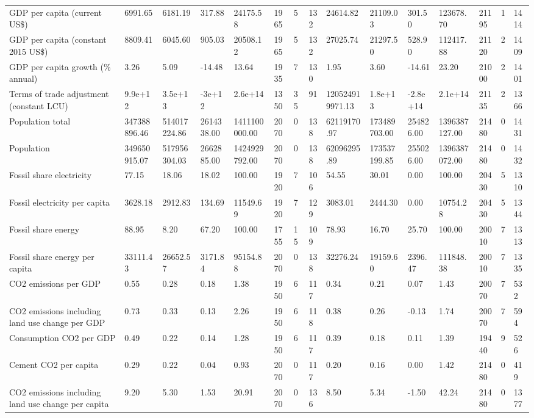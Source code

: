 \begin{longtable}{lllllllllllllll}
GDP per capita (current US\$) & 6991.65 & 6181.19 & 317.88 & 24175.58 & 1965 & 5 & 132 & 24614.82 & 21109.03 & 301.50 & 123678.70 & 21195 & 1 & 1414\\
GDP per capita (constant 2015 US\$) & 8809.41 & 6045.60 & 905.03 & 20508.12 & 1965 & 5 & 132 & 27025.74 & 21297.50 & 528.90 & 112417.88 & 21120 & 2 & 1409\\
\addlinespace
GDP per capita growth (\% annual) & 3.26 & 5.09 & -14.48 & 13.64 & 1935 & 7 & 130 & 1.95 & 3.60 & -14.61 & 23.20 & 21000 & 2 & 1401\\
Terms of trade adjustment (constant LCU) & 9.9e+12 & 3.5e+13 & -3e+12 & 2.6e+14 & 1350 & 35 & 91 & 120524919971.13 & 1.8e+13 & -2.8e+14 & 2.1e+14 & 21135 & 2 & 1366\\
Population total & 347388896.46 & 514017224.86 & 2614338.00 & 1411100000.00 & 2070 & 0 & 138 & 62119170.97 & 173489703.00 & 254826.00 & 1396387127.00 & 21480 & 0 & 1431\\
Population & 349650915.07 & 517956304.03 & 2662885.00 & 1424929792.00 & 2070 & 0 & 138 & 62096295.89 & 173537199.85 & 255026.00 & 1396387072.00 & 21480 & 0 & 1432\\
Fossil share electricity & 77.15 & 18.06 & 18.02 & 100.00 & 1920 & 7 & 106 & 54.55 & 30.01 & 0.00 & 100.00 & 20430 & 5 & 1310\\
\addlinespace
Fossil electricity per capita & 3628.18 & 2912.83 & 134.69 & 11549.69 & 1920 & 7 & 129 & 3083.01 & 2444.30 & 0.00 & 10754.28 & 20430 & 5 & 1344\\
Fossil share energy & 88.95 & 8.20 & 67.20 & 100.00 & 1755 & 15 & 109 & 78.93 & 16.70 & 25.70 & 100.00 & 20010 & 7 & 1313\\
Fossil share energy per capita & 33111.43 & 26652.57 & 3171.84 & 95154.88 & 2070 & 0 & 138 & 32276.24 & 19159.60 & 2396.47 & 111848.38 & 20010 & 7 & 1335\\
CO2 emissions per GDP & 0.55 & 0.28 & 0.18 & 1.38 & 1950 & 6 & 117 & 0.34 & 0.21 & 0.07 & 1.43 & 20070 & 7 & 532\\
CO2 emissions including land use change per GDP & 0.73 & 0.33 & 0.13 & 2.26 & 1950 & 6 & 118 & 0.38 & 0.26 & -0.13 & 1.74 & 20070 & 7 & 594\\
\addlinespace
Consumption CO2 per GDP & 0.49 & 0.22 & 0.14 & 1.28 & 1950 & 6 & 117 & 0.39 & 0.18 & 0.11 & 1.39 & 19440 & 9 & 526\\
Cement CO2 per capita & 0.29 & 0.22 & 0.04 & 0.93 & 2070 & 0 & 117 & 0.20 & 0.16 & 0.00 & 1.42 & 21480 & 0 & 419\\
CO2 emissions including land use change per capita & 9.20 & 5.30 & 1.53 & 20.91 & 2070 & 0 & 136 & 8.50 & 5.34 & -1.50 & 42.24 & 21480 & 0 & 1377\\

\end{longtable}
